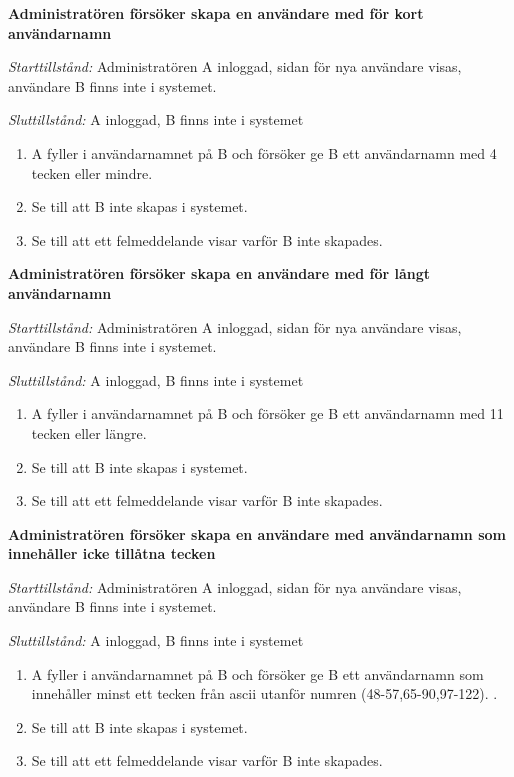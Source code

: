 \documentclass[a4paper]{article}
\begin{document}
\begin{FT}
\item
\textbf{Administratören försöker skapa en användare med för kort användarnamn}

\emph{Starttillstånd:} Administratören A inloggad, sidan för nya användare visas, användare B finns inte i systemet.

\emph{Sluttillstånd:} A inloggad, B finns inte i systemet

\begin{enumerate}
\item A fyller i användarnamnet på B och försöker ge B ett användarnamn med 4 tecken eller mindre.
\item Se till att B inte skapas i systemet.
\item Se till att ett felmeddelande visar varför B inte skapades.
\end{enumerate}

\item
\textbf{Administratören försöker skapa en användare med för långt användarnamn}

\emph{Starttillstånd:} Administratören A inloggad, sidan för nya användare visas, användare B finns inte i systemet.

\emph{Sluttillstånd:} A inloggad, B finns inte i systemet

\begin{enumerate}
\item A fyller i användarnamnet på B och försöker ge B ett användarnamn med 11 tecken eller längre.
\item Se till att B inte skapas i systemet.
\item Se till att ett felmeddelande visar varför B inte skapades.
\end{enumerate}

\item
\textbf{Administratören försöker skapa en användare med användarnamn som innehåller icke tillåtna tecken}

\emph{Starttillstånd:} Administratören A inloggad, sidan för nya användare visas, användare B finns inte i systemet.

\emph{Sluttillstånd:} A inloggad, B finns inte i systemet

\begin{enumerate}
\item A fyller i användarnamnet på B och försöker ge B ett användarnamn som innehåller minst ett tecken från ascii utanför numren (48-57,65-90,97-122).  .
\item Se till att B inte skapas i systemet.
\item Se till att ett felmeddelande visar varför B inte skapades.
\end{enumerate}


\end{FT}
\end{document}
